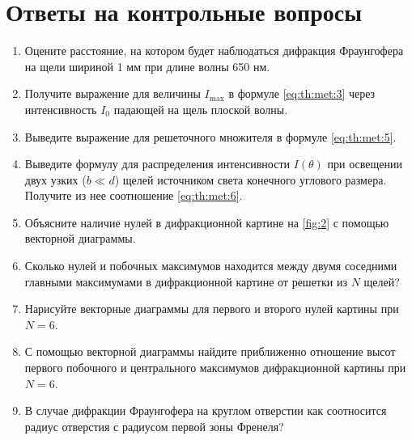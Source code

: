 \section{Ответы на контрольные вопросы}


\begin{enumerate}
	\item Оцените расстояние, на котором будет наблюдаться дифракция Фраунгофера на щели шириной 1 мм при длине волны 650 нм.
	
	\item Получите выражение для величины $I_{\max}$ в формуле \cref{eq:th:met:3} через интенсивность $I_0$ падающей на щель плоской волны.
	
	\item Выведите выражение для решеточного множителя в формуле \cref{eq:th:met:5}.
	
	\item Выведите формулу для распределения интенсивности $I(\theta)$ при освещении двух узких ($b \ll d$) щелей источником света конечного углового размера. Получите из нее соотношение \cref{eq:th:met:6}.
	
	\item Объясните наличие нулей в дифракционной картине на \cref{fig:2} с помощью векторной диаграммы.
	
	\item Сколько нулей и побочных максимумов находится между двумя соседними главными максимумами в дифракционной картине от решетки из $N$ щелей?
	
	\item Нарисуйте векторные диаграммы для первого и второго нулей картины при $N = 6$.
	
	\item С помощью векторной диаграммы найдите приближенно отношение высот первого побочного и центрального максимумов дифракционной картины при $N = 6$.
	
	\item В случае дифракции Фраунгофера на круглом отверстии как соотносится радиус отверстия с радиусом первой зоны Френеля?
\end{enumerate}